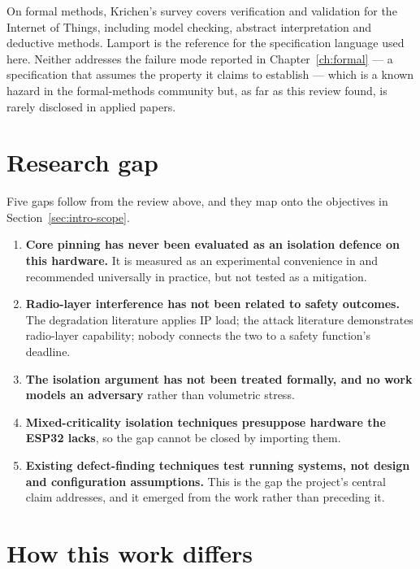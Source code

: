On formal methods, Krichen's survey \cite{krichen2023} covers verification and validation for
the Internet of Things, including model checking, abstract interpretation and deductive
methods. Lamport \cite{lamport2002} is the reference for the specification language used here.
Neither addresses the failure mode reported in Chapter~\ref{ch:formal} — a specification that
assumes the property it claims to establish — which is a known hazard in the formal-methods
community but, as far as this review found, is rarely disclosed in applied papers.

\section{Research gap}

Five gaps follow from the review above, and they map onto the objectives in
Section~\ref{sec:intro-scope}.

\begin{enumerate}[leftmargin=1.8em,itemsep=5pt]
  \item \textbf{Core pinning has never been evaluated as an isolation defence on this
        hardware.} It is measured as an experimental convenience in \cite{behnke2023} and
        recommended universally in practice, but not tested as a mitigation.
  \item \textbf{Radio-layer interference has not been related to safety outcomes.} The
        degradation literature applies IP load; the attack literature demonstrates radio-layer
        capability; nobody connects the two to a safety function's deadline.
  \item \textbf{The isolation argument has not been treated formally, and no work models an
        adversary} rather than volumetric stress.
  \item \textbf{Mixed-criticality isolation techniques presuppose hardware the ESP32 lacks},
        so the gap cannot be closed by importing them.
  \item \textbf{Existing defect-finding techniques test running systems, not design and
        configuration assumptions.} This is the gap the project's central claim addresses, and
        it emerged from the work rather than preceding it.
\end{enumerate}

\section{How this work differs}

